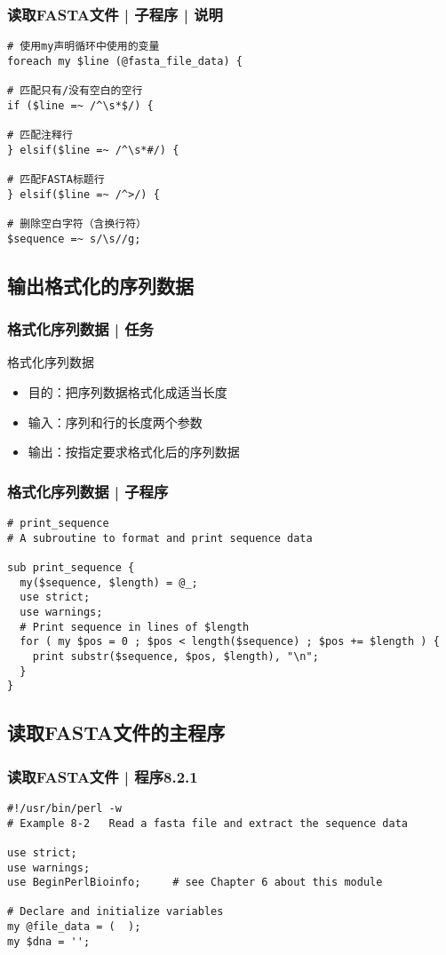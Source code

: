 \begin{frame}[fragile]
  \frametitle{读取FASTA文件 | 子程序 | \alert{说明}}
\begin{lstlisting}
# 使用my声明循环中使用的变量
foreach my $line (@fasta_file_data) {

# 匹配只有/没有空白的空行
if ($line =~ /^\s*$/) {

# 匹配注释行
} elsif($line =~ /^\s*#/) {

# 匹配FASTA标题行
} elsif($line =~ /^>/) {

# 删除空白字符（含换行符）
$sequence =~ s/\s//g;
\end{lstlisting}
\end{frame}

\subsection{输出格式化的序列数据}
\begin{frame}
  \frametitle{格式化序列数据 | 任务}
  \begin{block}{格式化序列数据}
    \begin{itemize}
      \item 目的：把序列数据格式化成适当长度
      \item 输入：序列和行的长度两个参数
      \item 输出：按指定要求格式化后的序列数据
    \end{itemize}
  \end{block}
\end{frame}

\begin{frame}[fragile]
  \frametitle{格式化序列数据 | \alert{子程序}}
\begin{lstlisting}
# print_sequence
# A subroutine to format and print sequence data 

sub print_sequence {
  my($sequence, $length) = @_;
  use strict;
  use warnings;
  # Print sequence in lines of $length
  for ( my $pos = 0 ; $pos < length($sequence) ; $pos += $length ) {
    print substr($sequence, $pos, $length), "\n";
  }
}
\end{lstlisting}
\end{frame}

\subsection{读取FASTA文件的主程序}
\begin{frame}[fragile]
  \frametitle{读取FASTA文件 | 程序8.2.1}
\begin{lstlisting}[firstnumber=1]
#!/usr/bin/perl -w
# Example 8-2   Read a fasta file and extract the sequence data

use strict;
use warnings;
use BeginPerlBioinfo;     # see Chapter 6 about this module

# Declare and initialize variables
my @file_data = (  );
my $dna = '';
\end{lstlisting}
\end{frame}

